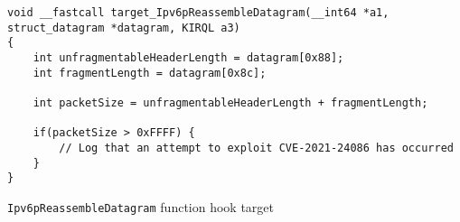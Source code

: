 \documentclass{report}
\begin{document}
\begin{listing}[H]
    \begin{verbatim}
void __fastcall target_Ipv6pReassembleDatagram(__int64 *a1, struct_datagram *datagram, KIRQL a3)
{
    int unfragmentableHeaderLength = datagram[0x88];
    int fragmentLength = datagram[0x8c];

    int packetSize = unfragmentableHeaderLength + fragmentLength;

    if(packetSize > 0xFFFF) {
        // Log that an attempt to exploit CVE-2021-24086 has occurred
    }
}
\end{verbatim}
\caption{\texttt{Ipv6pReassembleDatagram} function hook target}
\label{listing:detection:hooking:c-function}
\end{listing}
\end{document}
